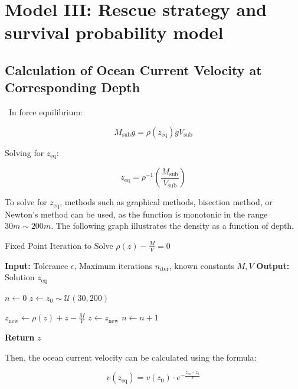 \section{Model III: Rescue strategy and survival probability model}

\subsection{Calculation of Ocean Current Velocity at Corresponding Depth}
\
\indent In force equilibrium:

\begin{equation}
	M_{\text{sub}} g = \rho(z_{\text{eq}}) g V_{\text{sub}}
\end{equation}

Solving for \( z_{\text{eq}} \):

\begin{equation}
	z_{\text{eq}} = \rho^{-1}\left(\frac{M_{\text{sub}}}{V_{\text{sub}}}\right)
\end{equation}

To solve for \( z_{\text{eq}} \), methods such as graphical methods, bisection method, or Newton’s method can be used, as the function is monotonic in the range \( 30m \sim 200m \). The following graph illustrates the density as a function of depth.

\begin{algorithm}[H]
	\caption{Fixed Point Iteration to Solve \( \rho(z) - \frac{M}{V} = 0 \)}
	\begin{algorithmic}[1]
		\STATE \textbf{Input:} Tolerance \( \epsilon \), Maximum iterations \( n_{\text{iter}} \), known constants \( M, V \)
		\STATE \textbf{Output:} Solution \( z_{\text{eq}} \)

		\STATE \( n \leftarrow 0 \)
		\STATE \( z \leftarrow z_0 \sim \mathcal{U}(30, 200) \)

		\STATE \( z_{\text{new}} \leftarrow \rho(z) + z - \frac{M}{V} \)
		\STATE \( z \leftarrow z_{\text{new}} \)
		\STATE \( n \leftarrow n + 1 \)
		\ENDWHILE

		\STATE \textbf{Return} \( z \)
	\end{algorithmic}
\end{algorithm}


Then, the ocean current velocity can be calculated using the formula:

\begin{equation}
	v(z_{\text{eq}}) = v(z_0) \cdot e^{-\frac{z_{\text{eq}} - z_0}{\delta}}
\end{equation}

